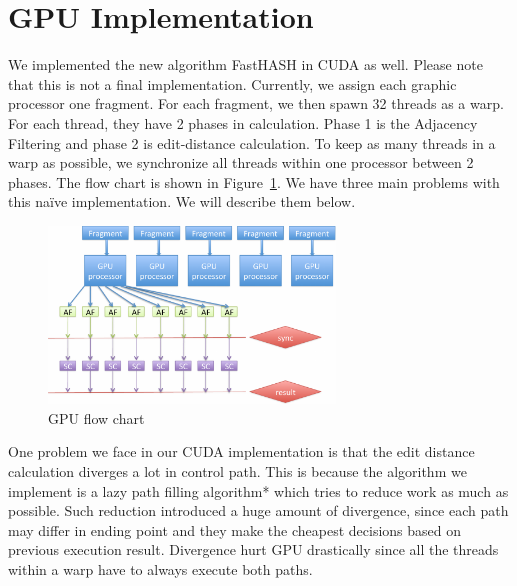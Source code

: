\section{GPU Implementation} \label{sec:gpu} 

We implemented the new algorithm FastHASH in CUDA as well. Please note that
this is not a final implementation. Currently, we assign each graphic processor
one fragment. For each fragment, we then spawn 32 threads as a warp.  For each
thread, they have 2 phases in calculation. Phase 1 is the Adjacency Filtering
and phase 2 is edit-distance calculation. To keep as many threads in a warp as
possible, we synchronize all threads within one processor between 2 phases. The
flow chart is shown in Figure~\ref{fig:gpu}.  We have three main problems with
this naïve implementation. We will describe them below. \\

\begin{figure}[t]
\centering
\vspace{0.1in}
\includegraphics[width=3in]{./figure/gpu_B.pdf} \vspace{0in}
\caption{GPU flow chart}
\label{fig:gpu}
\end{figure}

One problem we face in our CUDA implementation is that the edit distance
calculation diverges a lot in control path. This is because the algorithm we
implement is a lazy path filling algorithm* which tries to reduce work as much
as possible. Such reduction introduced a huge amount of divergence, since each
path may differ in ending point and they make the cheapest decisions based on
previous execution result. Divergence hurt GPU drastically since all the
threads within a warp have to always execute both paths. \\

